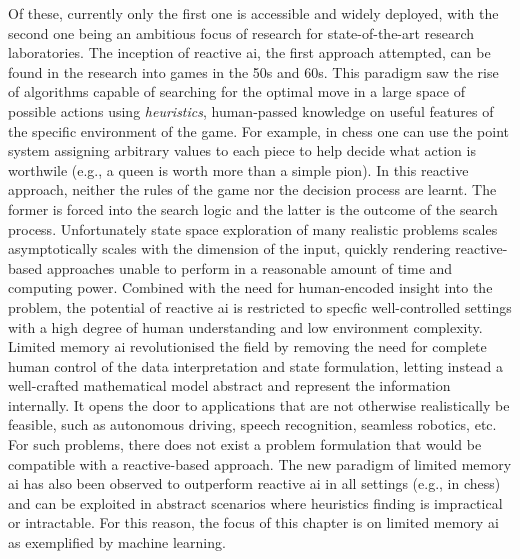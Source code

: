 Of these, currently only the first one is accessible and widely deployed, with the second one being an ambitious focus of research for state-of-the-art research laboratories. The inception of reactive \gls{ai}, the first approach attempted, can be found in the research into games in the 50s and 60s. This paradigm saw the rise of algorithms capable of searching for the optimal move in a large space of possible actions using \textit{heuristics}, human-passed knowledge on useful features of the specific environment of the game. For example, in chess one can use the point system assigning arbitrary values to each piece to help decide what action is worthwile (e.g., a queen is worth more than a simple pion). In this reactive approach, neither the rules of the game nor the decision process are learnt. The former is forced into the search logic and the latter is the outcome of the search process. Unfortunately state space exploration of many realistic problems scales asymptotically scales with the dimension of the input, quickly rendering reactive-based approaches unable to perform in a reasonable amount of time and computing power. Combined with the need for human-encoded insight into the problem, the potential of reactive \gls{ai} is restricted to specfic well-controlled settings with a high degree of human understanding and low environment complexity. Limited memory \gls{ai} revolutionised the field by removing the need for complete human control of the data interpretation and state formulation, letting instead a well-crafted mathematical model abstract and represent the information internally. It opens the door to applications that are not otherwise realistically be feasible, such as autonomous driving, speech recognition, seamless robotics, etc. For such problems, there does not exist a problem formulation that would be compatible with a reactive-based approach. The new paradigm of limited memory \gls{ai} has also been observed to outperform reactive \gls{ai} in all settings (e.g., in chess) and can be exploited in abstract scenarios where heuristics finding is impractical or intractable. For this reason, the focus of this chapter is on limited memory \gls{ai} as exemplified by machine learning. 

